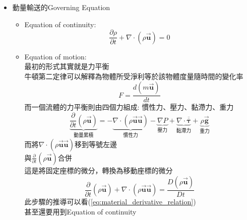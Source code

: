 \documentclass[../main.tex]{subfiles}
\begin{document}
\begin{itemize}
\begin{itemize}
\begin{equation}
    \end{equation}
    \item Gravity Force (重力)，純量，$\rho \vec {\bm g}$\\
    實際上也不是力，而是力/體積
    \begin{equation}
      \text{Gravity Force} = \frac{\text{真重力}}{V} = \frac{m\vec {\bm g}}{V} = \frac{\rho V \vec {\bm g}}{V} = \rho \vec {\bm g}
    \end{equation}
  \end{itemize}
  \item 動量輸送的Governing Equation
  \begin{itemize}
    \item Equation of continuity:
      \begin{equation}
        \frac{\partial \rho}{\partial t} + \nabla \cdot (\rho \vec {\bm u}) = 0
      \end{equation}
    \item Equation of motion:\\
      最初的形式其實就是力平衡\\
      牛頓第二定律可以解釋為物體所受淨利等於該物體度量隨時間的變化率
      \begin{equation}
        F = \frac{d(m\vec {\bm u})}{dt}
      \end{equation}
      而一個流體的力平衡則由四個力組成: 慣性力、壓力、黏滯力、重力
      \begin{equation}
        \underbrace{\frac{\partial}{\partial t}(\rho \vec {\bm u})}_{\text{動量累積}} = 
        - \underbrace{\nabla \cdot (\rho \vec {\bm u} \vec {\bm u})}_{\text{慣性力}} -
        \underbrace{\nabla P}_{\text{壓力}} +
        \underbrace{\nabla \cdot \overline{\overline{\bm \tau}}}_{\text{黏滯力}} +
        \underbrace{\rho \vec {\bm g}}_{\text{重力}}
      \end{equation}
      而將$\nabla \cdot (\rho \vec {\bm u} \vec {\bm u})$移到等號左邊\\
      與$\frac{\partial}{\partial t}(\rho \vec {\bm u})$合併\\
      這是將固定座標的微分，轉換為移動座標的微分
      \begin{equation}
        \frac{\partial}{\partial t}(\rho \vec {\bm u}) + \nabla \cdot (\rho \vec {\bm u} \vec {\bm u}) = \frac{D(\rho \vec {\bm u})}{Dt}
      \end{equation}
      此步驟的推導可以看(\ref{eq:material_derivative_relation})\\
      甚至還要用到Equation of continuity\\

\end{itemize}
\end{itemize}
\end{document}
